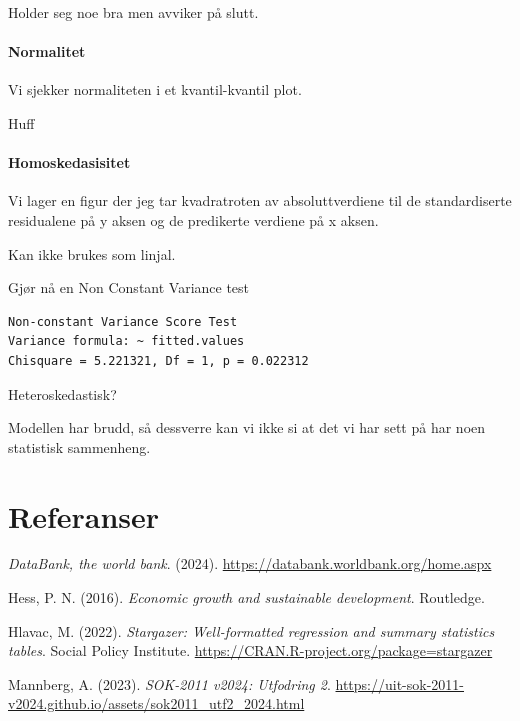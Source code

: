 \documentclass[
  12pt,
  a4paper,
  DIV=11,
  numbers=noendperiod]{scrartcl}
\let\oldparagraph\paragraph
\renewcommand{\paragraph}[1]{\oldparagraph{#1}\mbox{}}
\newlength{\cslhangindent}
\newenvironment{CSLReferences}[2] %
 {\begin{list}{}{%
  \setlength{\itemindent}{0pt}
  \setlength{\leftmargin}{0pt}
  \setlength{\parsep}{0pt}
  \ifodd #1
   \setlength{\leftmargin}{\cslhangindent}
   \setlength{\itemindent}{-1\cslhangindent}
  \fi
  \setlength{\itemsep}{#2\baselineskip}}}
 {\end{list}}
\begin{document}
Holder seg noe bra men avviker på slutt.

\paragraph{Normalitet}\label{normalitet}

Vi sjekker normaliteten i et kvantil-kvantil plot.

Huff

\paragraph{Homoskedasisitet}\label{homoskedasisitet}

Vi lager en figur der jeg tar kvadratroten av absoluttverdiene til de
standardiserte residualene på y aksen og de predikerte verdiene på x
aksen.

Kan ikke brukes som linjal.

Gjør nå en Non Constant Variance test

\begin{verbatim}
Non-constant Variance Score Test 
Variance formula: ~ fitted.values 
Chisquare = 5.221321, Df = 1, p = 0.022312
\end{verbatim}

Heteroskedastisk?

Modellen har brudd, så dessverre kan vi ikke si at det vi har sett på
har noen statistisk sammenheng.

\clearpage

\section{Referanser}\label{referanser}

\label{refs}
\begin{CSLReferences}{1}{0}
\emph{DataBank, the world bank}. (2024).
\url{https://databank.worldbank.org/home.aspx}

Hess, P. N. (2016). \emph{Economic growth and sustainable development}.
Routledge.

Hlavac, M. (2022). \emph{Stargazer: Well-formatted regression and
summary statistics tables}. Social Policy Institute.
\url{https://CRAN.R-project.org/package=stargazer}

Mannberg, A. (2023). \emph{SOK-2011 v2024: Utfodring 2}.
\url{https://uit-sok-2011-v2024.github.io/assets/sok2011_utf2_2024.html}

\end{CSLReferences}
\end{document}
